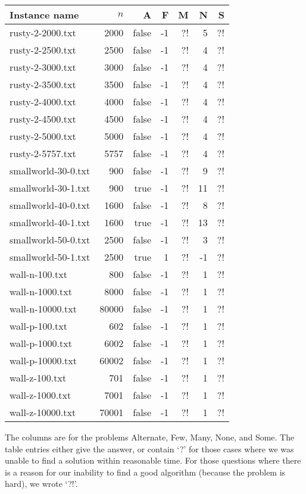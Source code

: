 \documentclass{tufte-handout}
\begin{document}
\begin{tabular}{lrrrrrr}
  \toprule
  Instance name & $n$ & A & F & M & N & S \\
  \midrule
rusty-2-2000.txt&	2000 &	false &	-1 &	?! &	5 &	?! &	\\
rusty-2-2500.txt&	2500 &	false &	-1 &	?! &	4 &	?! &	\\
rusty-2-3000.txt&	3000 &	false &	-1 &	?! &	4 &	?! &	\\
rusty-2-3500.txt&	3500 &	false &	-1 &	?! &	4 &	?! &	\\
rusty-2-4000.txt&	4000 &	false &	-1 &	?! &	4 &	?! &	\\
rusty-2-4500.txt&	4500 &	false &	-1 &	?! &	4 &	?! &	\\
rusty-2-5000.txt&	5000 &	false &	-1 &	?! &	4 &	?! &	\\
rusty-2-5757.txt&	5757 &	false &	-1 &	?! &	4 &	?! &	\\
smallworld-30-0.txt&	900 &	false &	-1 &	?! &	9 &	?! &	\\
smallworld-30-1.txt&	900 &	true &	-1 &	?! &	11 &	?! &	\\
smallworld-40-0.txt&	1600 &	false &	-1 &	?! &	8 &	?! &	\\
smallworld-40-1.txt&	1600 &	true &	-1 &	?! &	13 &	?! &	\\
smallworld-50-0.txt&	2500 &	false &	-1 &	?! &	3 &	?! &	\\
smallworld-50-1.txt&	2500 &	true &	1 &	?! &	-1 &	?! &	\\
wall-n-100.txt&	800 &	false &	-1 &	?! &	1 &	?! &	\\
wall-n-1000.txt&	8000 &	false &	-1 &	?! &	1 &	?! &	\\
wall-n-10000.txt&	80000 &	false &	-1 &	?! &	1 &	?! &	\\
wall-p-100.txt&	602 &	false &	-1 &	?! &	1 &	?! &	\\
wall-p-1000.txt&	6002 &	false &	-1 &	?! &	1 &	?! &	\\
wall-p-10000.txt&	60002 &	false &	-1 &	?! &	1 &	?! &	\\
wall-z-100.txt&	701 &	false &	-1 &	?! &	1 &	?! &	\\
wall-z-1000.txt&	7001 &	false &	-1 &	?! &	1 &	?! &	\\
wall-z-10000.txt&	70001 &	false &	-1 &	?! &	1 &	?! &	\\
  \bottomrule
\end{tabular}
\medskip

The columns are for the problems Alternate, Few, Many, None, and Some.
The table entries either give the answer, or contain `?' for those cases where we was unable to find a solution within reasonable time.
For those questions where there is a reason for our inability to find a good algorithm (because the problem is hard), we wrote `?!'.
\end{document}
